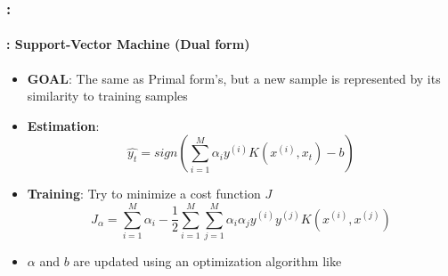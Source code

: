 \documentclass[xcolor=table]{beamer}
\begin{document}
\begin{frame}
	\frametitle{\insertshortsubtitle: \insertsection}
	\framesubtitle{\insertsubsection: Support-Vector Machine (Dual form)}
	
	\begin{minipage}{0.75\textwidth} 
		\begin{itemize}
			\item \textbf{GOAL}: The same as Primal form's, but a new sample is represented by its similarity to training samples
			\item \textbf{Estimation}: 
			\[\hat{y_t} = sign(\sum^M_{i=1} \alpha_i y^{(i)} K(x^{(i)}, x_t) - b)\]
		\end{itemize}
	\end{minipage}
	\begin{minipage}{0.24\textwidth} 
	\end{minipage}


	\begin{itemize}
		\item \textbf{Training}: Try to minimize a cost function $ J $
		\[J_\alpha = \sum\limits_{i=1}^{M} \alpha_i - \frac{1}{2} \sum\limits_{i=1}^{M} \sum\limits_{j=1}^{M} \alpha_i \alpha_j y^{(i)} y^{(j)} K(x^{(i)}, x^{(j)})\]
		\item $\alpha$ and $ b $ are updated using an optimization algorithm like 
	\end{itemize}
	
\end{frame}
\end{document}
